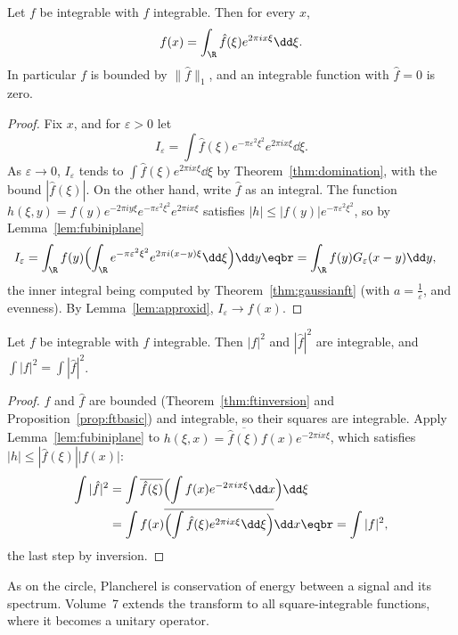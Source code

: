\begin{theorem}\label{thm:ftinversion}
Let $f$ be integrable with $\hat f$ integrable. Then for every $x$,
\[
f(x)=\int_{\R}\hat f(\xi)e^{2\pi ix\xi}\dd\xi.
\]
In particular $f$ is bounded by $\|\hat f\|_1$, and an integrable function with $\hat f=0$ is zero.
\end{theorem}
\begin{proof}
Fix $x$, and for $\varepsilon>0$ let
\[
I_\varepsilon=\int\hat f(\xi)e^{-\pi\varepsilon^2\xi^2}e^{2\pi ix\xi}\dd\xi.
\]
As $\varepsilon\to0$, $I_\varepsilon$ tends to $\int\hat f(\xi)e^{2\pi ix\xi}\dd\xi$ by Theorem~\ref{thm:domination}, with the bound $|\hat f(\xi)|$. On the other hand, write $\hat f$ as an integral. The function $h(\xi,y)=f(y)e^{-2\pi iy\xi}e^{-\pi\varepsilon^2\xi^2}e^{2\pi ix\xi}$
satisfies $|h|\le|f(y)|e^{-\pi\varepsilon^2\xi^2}$, so by Lemma~\ref{lem:fubiniplane}
\[
\begin{aligned}I_\varepsilon&=\int_{\R}f(y)\Bigl(\int_{\R}e^{-\pi\varepsilon^2\xi^2}e^{2\pi i(x-y)\xi}\dd\xi\Bigr)\dd y\eqbr=\int_{\R}f(y)G_\varepsilon(x-y)\dd y,\end{aligned}
\]
the inner integral being computed by Theorem~\ref{thm:gaussianft} (with $a=\frac1\varepsilon$, and evenness). By Lemma~\ref{lem:approxid}, $I_\varepsilon\to f(x)$.
\end{proof}

\begin{theorem}[Plancherel]\label{thm:plancherel}
Let $f$ be integrable with $\hat f$ integrable. Then $|f|^2$ and $|\hat f|^2$ are integrable, and $\int|f|^2=\int|\hat f|^2$.
\end{theorem}
\begin{proof}
$f$ and $\hat f$ are bounded (Theorem~\ref{thm:ftinversion} and Proposition~\ref{prop:ftbasic}) and integrable, so their squares are integrable. Apply
Lemma~\ref{lem:fubiniplane} to $h(\xi,x)=\overline{\hat f(\xi)}f(x)e^{-2\pi ix\xi}$, which satisfies $|h|\le|\hat f(\xi)||f(x)|$:
\[
\begin{aligned}\int|\hat f|^2&=\int\overline{\hat f(\xi)}\Bigl(\int f(x)e^{-2\pi ix\xi}\dd x\Bigr)\dd\xi\\&=\int f(x)\overline{\Bigl(\int\hat f(\xi)e^{2\pi ix\xi}\dd\xi\Bigr)}\dd x\eqbr=\int|f|^2,\end{aligned}
\]
the last step by inversion.
\end{proof}

As on the circle, Plancherel is conservation of energy between a signal and its spectrum. Volume~7 extends the transform to
all square-integrable functions, where it becomes a unitary operator.

